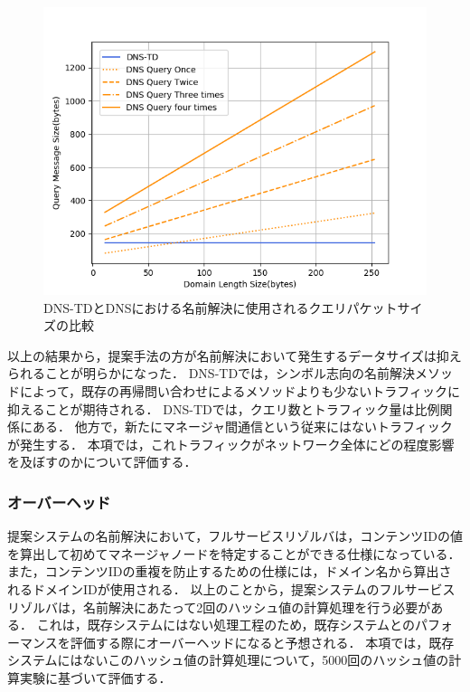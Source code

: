 \begin{figure}[h]
 \centering
 \includegraphics[scale=0.8]{figure/length-size.png}
 \caption{DNS-TDとDNSにおける名前解決に使用されるクエリパケットサイズの比較}
 \label{fig:length-size}
\end{figure}

以上の結果から，提案手法の方が名前解決において発生するデータサイズは抑えられることが明らかになった．
DNS-TDでは，シンボル志向の名前解決メソッドによって，既存の再帰問い合わせによるメソッドよりも少ないトラフィックに抑えることが期待される．
DNS-TDでは，クエリ数とトラフィック量は比例関係にある．
他方で，新たにマネージャ間通信という従来にはないトラフィックが発生する．
本項では，これトラフィックがネットワーク全体にどの程度影響を及ぼすのかについて評価する．

\newpage
\subsubsection{オーバーヘッド}
提案システムの名前解決において，フルサービスリゾルバは，コンテンツIDの値を算出して初めてマネージャノードを特定することができる仕様になっている．
また，コンテンツIDの重複を防止するための仕様には，ドメイン名から算出されるドメインIDが使用される．
以上のことから，提案システムのフルサービスリゾルバは，名前解決にあたって2回のハッシュ値の計算処理を行う必要がある．
これは，既存システムにはない処理工程のため，既存システムとのパフォーマンスを評価する際にオーバーヘッドになると予想される．
本項では，既存システムにはないこのハッシュ値の計算処理について，5000回のハッシュ値の計算実験に基づいて評価する．

